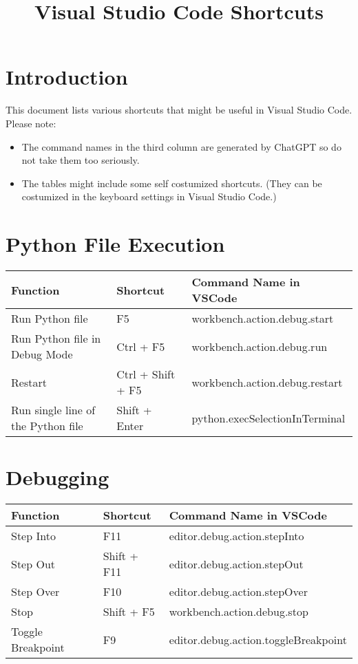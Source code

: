 \documentclass{article}
\begin{document}
\title{Visual Studio Code Shortcuts}
\author{}
\date{}

\maketitle

\normalsize
\section*{Introduction}
This document lists various shortcuts that might be useful in Visual Studio Code. Please note:
\begin{itemize}
    \item The command names in the third column are generated by ChatGPT so do not take them too seriously.
    \item The tables might include some self costumized shortcuts. (They can be costumized in the keyboard settings in Visual Studio Code.)
\end{itemize}

\section*{Python File Execution}
\begin{longtable}{|p{6cm}|p{3cm}|p{7cm}|}
\hline
\rowcolor{white}
\textbf{Function} & \textbf{Shortcut} & \textbf{Command Name in VSCode} \\
\hline
Run Python file & F5 & workbench.action.debug.start \\
Run Python file in Debug Mode & Ctrl + F5 & workbench.action.debug.run \\
Restart & Ctrl + Shift + F5 & workbench.action.debug.restart \\
Run single line of the Python file & Shift + Enter & python.execSelectionInTerminal \\
\hline
\end{longtable}

\section*{Debugging}
\begin{longtable}{|p{6cm}|p{3cm}|p{7cm}|}
\hline
\rowcolor{white}
\textbf{Function} & \textbf{Shortcut} & \textbf{Command Name in VSCode} \\
\hline
Step Into & F11 & editor.debug.action.stepInto \\
Step Out & Shift + F11 & editor.debug.action.stepOut \\
Step Over & F10 & editor.debug.action.stepOver \\
Stop & Shift + F5 & workbench.action.debug.stop \\
Toggle Breakpoint & F9 & editor.debug.action.toggleBreakpoint \\
\hline
\end{longtable}
\end{document}
